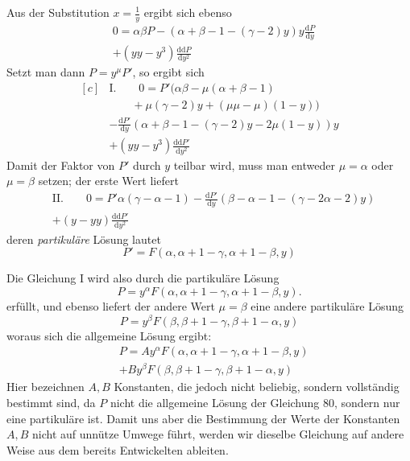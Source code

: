 Aus der Substitution \(x=\frac{1}{y}\) ergibt sich ebenso
\[
\begin{aligned}&0=\alpha\beta P-(\alpha+\beta-1-(\gamma-2)y)y\frac{\mathrm{d}P}{\mathrm{d}y}\\&+(yy-y^3)\frac{\mathrm{d}\mathrm{d}P}{\mathrm{d}y^2}\end{aligned}
\]
Setzt man dann \(P=y^\mu P'\), so ergibt sich
\[
\begin{aligned}[c]
&\mathrm{I.}\qquad 0=P'(\alpha\beta-\mu(\alpha+\beta-1)\\&\qquad+\mu(\gamma-2)y+(\mu\mu-\mu)(1-y))\\
&-\frac{\mathrm{d}P'}{\mathrm{d}y}(\alpha+\beta-1-(\gamma-2)y-2\mu(1-y))y\\
&+(yy-y^3)\frac{\mathrm{d}\mathrm{d}P'}{\mathrm{d}y^2}
\end{aligned}
\]
Damit der Faktor von \(P'\) durch \(y\) teilbar wird, muss man entweder \(\mu=\alpha\) oder \(\mu=\beta\) setzen; der erste Wert liefert
\[
\begin{aligned}&\mathrm{II.}\qquad
0=P'\alpha(\gamma-\alpha-1)-\frac{\mathrm{d}P'}{\mathrm{d}y}(\beta-\alpha-1-(\gamma-2\alpha-2)y)\\&+(y-yy)\frac{\mathrm{d}\mathrm{d}P'}{\mathrm{d}y^2}\end{aligned}
\]
deren \textit{partikuläre} Lösung lautet
\[
P'=F(\alpha,\alpha+1-\gamma,\alpha+1-\beta,y)
\]
\par{}
Die Gleichung I wird also durch die partikuläre Lösung
\[
P=y^\alpha F(\alpha,\alpha+1-\gamma,\alpha+1-\beta,y).
\]
erfüllt, und ebenso liefert der andere Wert \(\mu=\beta\) eine andere partikuläre Lösung
\[
P=y^\beta F(\beta,\beta+1-\gamma,\beta+1-\alpha,y)
\]
woraus sich die allgemeine Lösung ergibt:
\[
\begin{aligned}&P=Ay^\alpha F(\alpha,\alpha+1-\gamma,\alpha+1-\beta,y)\\&+By^\beta F(\beta,\beta+1-\gamma,\beta+1-\alpha,y)\end{aligned}
\]
Hier bezeichnen \(A,B\) Konstanten, die jedoch nicht beliebig, sondern vollständig bestimmt sind, da \(P\) nicht die allgemeine Lösung der Gleichung 80, sondern nur eine partikuläre ist. Damit uns aber die Bestimmung der Werte der Konstanten \(A,B\) nicht auf unnütze Umwege führt, werden wir dieselbe Gleichung auf andere Weise aus dem bereits Entwickelten ableiten.

